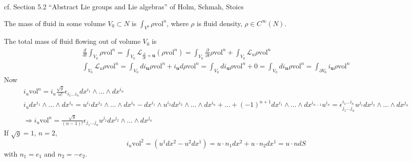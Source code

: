 \documentclass[twoside,landscape,10pt]{amsart}
\theoremstyle{plain}
\theoremstyle{definition}
\theoremstyle{remark}
\theoremstyle{remark}
\begin{document}
\begin{multicols*}{2}
cf. Section 5.2 ``Abstract Lie groups and Lie algebras'' of Holm, Schmah, Stoics \cite{DHolmTSchmahCStoica2009}




The mass of fluid in some volume $V_0 \subset N$ is $\int_{V^0} \rho \text{vol}^n$, where $\rho$ is fluid density, $\rho \in C^{\infty}(N)$.  

The total mass of fluid flowing out of volume $V_0$ is 
\[
\begin{gathered}
  \frac{d}{dt} \int_{V_0} \rho \text{vol}^n = \int_{V_0} \mathcal{L}_{\frac{\partial}{\partial t} + \textbf{u}} (\rho \text{vol}^n) = \int_{V_0} \frac{ \partial }{\partial t} \rho \text{vol}^n + \int_{V_0} \mathcal{L}_u \rho \text{vol}^n   \\
 \int_{V_0} \mathcal{L}_u \rho \text{vol}^n = \int_{V_0} di_{\mathbf{u}} \rho \text{vol}^n  + i_{\mathbf{u}} d\rho \text{vol}^n = \int_{V_0} di_{\mathbf{u}} \rho \text{vol}^n + 0 = \int_{V_0} di_{\mathbf{u}} \rho \text{vol}^n = \int_{\partial V_0} i_{\mathbf{u}} \rho \text{vol}^n
\end{gathered}
\]  
Now
\[
\begin{gathered}
  i_u \text{vol}^n = i_u\frac{\sqrt{g}}{n!} \epsilon_{i_1 \dots i_n} dx^{i_1} \wedge \dots \wedge dx^{i_n} \\ 
  i_u dx^{i_1} \wedge \dots \wedge dx^{i_n} = u^{i_1} dx^{i_2} \wedge \dots \wedge dx^{i_n} - dx^{i_1} \wedge u^{i_2} dx^{i_3} \wedge \dots \wedge dx^{i_n} +  \dots + (-1)^{n+1} dx^{i_1} \wedge \dots \wedge dx^{i_{n-1}} u^{i_n} = \epsilon^{i_1 \dots i_n}_{j_1 \dots j_n } u^{j_1 } dx^{j_2} \wedge \dots \wedge dx^{j_n}  \\
\Longrightarrow i_u\text{vol}^n = \frac{ \sqrt{g}}{ (n-1)!} \epsilon_{j_1 \dots j_n} u^{j_1} dx^{j_2} \wedge \dots \wedge dx^{j_n}
\end{gathered} 
\]
If $\sqrt{g} = 1$, $n=2$, 
\[
i_u \text{vol}^2 = (u^1 dx^2 - u^2 dx^1) = u\cdot n_1 dx^2 + u\cdot n_2 dx^1 = u\cdot n dS
\]
with $n_1 =e_1$ and $n_2=-e_2$.  


\end{multicols*}
\end{document}
